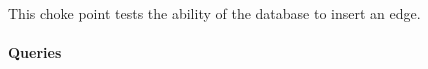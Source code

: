 
This choke point tests the ability of the database to insert an edge.


\paragraph{Queries}
{\raggedright
}